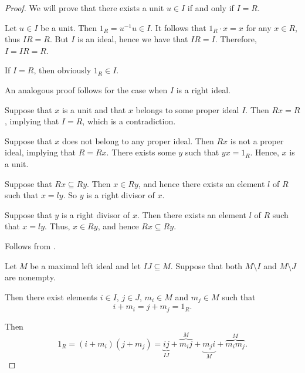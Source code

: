 \begin{proof}
   We will prove that there exists a unit \( u \in I \) if and only if \( I = R \).

  \SufficiencySubProof* Let \( u \in I \) be a unit. Then \( 1_R = u^{-1} u \in I \). It follows that \( 1_R \cdot x = x \) for any \( x \in R \), thus \( IR = R \). But \( I \) is an ideal, hence we have that \( IR = I \). Therefore, \( I = IR = R \).

  \NecessitySubProof* If \( I = R \), then obviously \( 1_R \in I \).

  An analogous proof follows for the case when \( I \) is a right ideal.


  \SufficiencySubProof* Suppose that \( x \) is a unit and that \( x \) belongs to some proper ideal \( I \). Then \( Rx = R \), implying that \( I = R \), which is a contradiction.

  \NecessitySubProof* Suppose that \( x \) does not belong to any proper ideal. Then \( Rx \) is not a proper ideal, implying that \( R = Rx \). There exists some \( y \) such that \( yx = 1_R \). Hence, \( x \) is a unit.


  \SufficiencySubProof* Suppose that \( Rx \subseteq Ry \). Then \( x \in Ry \), and hence there exists an element \( l \) of \( R \) such that \( x = ly \). So \( y \) is a right divisor of \( x \).

  \NecessitySubProof* Suppose that \( y \) is a right divisor of \( x \). Then there exists an element \( l \) of \( R \) such that \( x = ly \). Thus, \( x \in Ry \), and hence \( Rx \subseteq Ry \).

   Follows from .

   Let \( M \) be a maximal left ideal and let \( IJ \subseteq M \). Suppose that both \( M \setminus I \) and \( M \setminus J \) are nonempty.

  Then there exist elements \( i \in I \), \( j \in J \), \( m_i \in M \) and \( m_j \in M \) such that
  \begin{equation*}
    i + m_i = j + m_j = 1_R.
  \end{equation*}

  Then
  \begin{equation*}
    1_R = (i + m_i) (j + m_j) = \underbrace{ij}_{IJ} + \overbrace{m_i j}^M + \underbrace{m_j i}_M + \overbrace{m_i m_j}^M.
  \end{equation*}


\end{proof}

